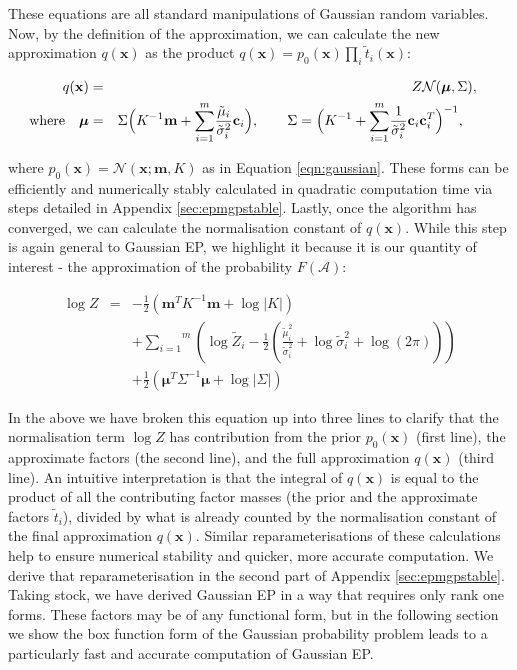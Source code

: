 \documentclass[twoside,11pt]{article}
\def\x{{\mathbf x}}
\def\c{{\mathbf c}}
\def\m{{\mathbf m}}
\def\boldmu{\bm{\mu}}
\def\regionA{\mathcal{A}}
\begin{document}
\noindent These
equations are all standard manipulations of Gaussian random variables.   Now, by the definition of the approximation, we can calculate the new approximation $q(\x)$ as the product $q(\x) = p_0(\x)\prod_i \tilde{t}_i(\x)$:

\begin{eqnarray}
\label{eqn:epmgppost}
 q(\x) & = &
Z\mathcal{N}(\boldmu,\Sigma),~~~\\
\mathrm{where}~~~\boldmu & = &
\Sigma\Bigl(K^{-1}\m + \overset{m}{\sum_{i=1}}\frac{\tilde{\mu}_i}{\tilde{\sigma}^2_i}\c_i \Bigr),~~~~~~\Sigma = \Bigl(K^{-1} +
\overset{m}{\sum_{i=1}} \frac{1}{\tilde{\sigma}^2_i}\c_i\c_i^T\Bigr)^{-1},~~~~~~\nonumber
\end{eqnarray}

\noindent where $p_0(\x) = \mathcal{N}(\x; \m,K)$ as in Equation \ref{eqn:gaussian}.  These forms can be efficiently and numerically stably calculated in quadratic computation time via steps detailed in Appendix \ref{sec:epmgpstable}.  Lastly, once the algorithm has converged, we can calculate the normalisation constant of $q(\x)$.  While this step is again general to Gaussian EP, we highlight it because it is our quantity of interest - the approximation of the probability $F(\regionA)$:

\begin{eqnarray}
\label{eqn:logZ}
\log Z & = &
-\frac{1}{2}\left(\m^TK^{-1}\m
+\log\lvert K \rvert \right) \nonumber \\
& &
+ \overset{m}{\sum_{i=1}}\left( \log \tilde{Z}_i
- \frac{1}{2}\left(\frac{\tilde{\mu}_i^2}{\tilde{\sigma}_i^2}
+ \log \tilde{\sigma}^2_i + \log(2\pi)\right)\right) \nonumber \\
& &
+ \frac{1}{2}\left(\boldmu^T\Sigma^{-1}\boldmu
+ \log\lvert \Sigma \rvert \right)
\end{eqnarray}

\noindent In the above we have broken this equation up into three lines to clarify that the normalisation term $\log Z$ has contribution from the prior $p_0(\x)$ (first line), the approximate factors (the second line), and the full approximation $q(\x)$ (third line).  An intuitive interpretation is that the integral of $q(\x)$ is equal to the product of all the contributing factor masses (the prior and the approximate factors $\tilde{t}_i$), divided by what is already counted by the normalisation constant of the final approximation $q(\x)$.  Similar reparameterisations of these calculations help to ensure numerical stability and quicker, more accurate computation.  We derive that reparameterisation in the second part of Appendix \ref{sec:epmgpstable}.   Taking stock, we have derived Gaussian EP in a way that requires only rank one forms.  These factors may be of any functional form, but in the following section we show the box function form of the Gaussian probability problem leads to a particularly fast and accurate computation of Gaussian EP.
\end{document}
